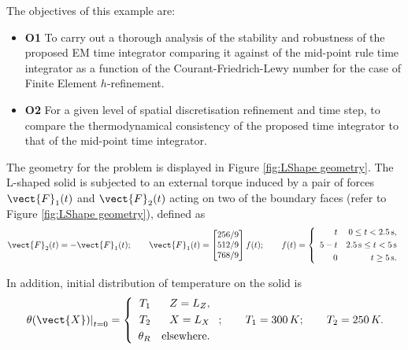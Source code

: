 The objectives of this example are:
%
\begin{itemize}

\item \textbf{O1} To carry out a thorough analysis of the stability and robustness of the proposed EM time integrator comparing it against of the mid-point rule time integrator  as a function of the Courant-Friedrich-Lewy number for the case of Finite Element $h$-refinement. 

\item \textbf{O2}   For a given level of spatial discretisation refinement and time step, to compare the thermodynamical consistency of the proposed time integrator to that of the mid-point time integrator.


\end{itemize}	

The geometry for the problem is displayed in Figure \ref{fig:LShape geometry}. The L-shaped solid is subjected to an external torque induced by a pair of forces $\vect{F}_1(t)$ and $\vect{F}_2(t)$ acting on two of the boundary faces (refer to Figure \ref{fig:LShape geometry}), defined as
%
\begin{equation}\label{eqn:Torque}
\vect{F}_2(t)=-\vect{F}_1(t);\qquad
\vect{F}_1(t)=\begin{bmatrix}
256/9\\512/9\\768/9
\end{bmatrix}f(t);\qquad f(t)=\left\{\begin{array}{ccc}
\begin{aligned}
t&&0\leq t<2.5\,\text{s} ,\\
5-t&&2.5\,\text{s}\leq t<5\,\text{s}\\
0  &&t\geq 5\,\text{s}. 
\end{aligned} 
\end{array}\right.
\end{equation}

In addition, initial distribution of temperature on the solid is
%
\begin{equation}
\left.\theta(\vect{X})\right\vert_{t=0}=\left\{\begin{array}{ccc}
\begin{aligned}
T_1&&Z=L_Z ,\\
T_2&&X=L_X\\
\theta_R  &&\text{elsewhere}. 
\end{aligned} 
\end{array}\right.;\qquad
T_1=300\,K; \qquad  T_2=250\,K.
\end{equation} 


